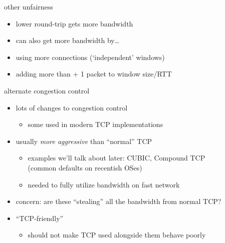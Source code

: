 \begin{frame}{other unfairness}
    \begin{itemize}
    \item lower round-trip gets more bandwidth
    \item can also get more bandwidth by\ldots
    \vspace{.5cm}
    \item using more connections (`independent' windows)
    \item adding more than + 1 packet to window size/RTT
    \end{itemize}
\end{frame}

\begin{frame}{alternate congestion control}
    \begin{itemize}
    \item lots of changes to congestion control
        \begin{itemize}
        \item some used in modern TCP implementations
        \end{itemize}
    \item usually \textit{more aggressive} than ``normal'' TCP
        \begin{itemize}
        \item examples we'll talk about later: CUBIC, Compound TCP \\
            (common defaults on recentish OSes)
        \item needed to fully utilize bandwidth on fast network
        \end{itemize}
    \vspace{.5cm}
    \item concern: are these ``stealing'' all the bandwidth from normal TCP?
    \item ``TCP-friendly''
        \begin{itemize}
        \item should not make TCP used alongside them behave poorly
        \end{itemize}
    \end{itemize}
\end{frame}


